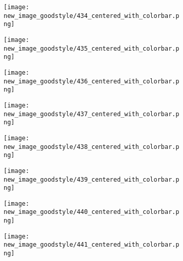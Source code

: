 \documentclass[a4paper,12pt]{article}
\begin{document}
\begin{figure}[H]
  \begin{subfigure}{0.11\textwidth}
    \texttt{[image: new\_image\_goodstyle/434\_centered\_with\_colorbar.png]}
  \end{subfigure}
  \hfill
  \begin{subfigure}{0.11\textwidth}
    \texttt{[image: new\_image\_goodstyle/435\_centered\_with\_colorbar.png]}
  \end{subfigure}
  \hfill
  \begin{subfigure}{0.11\textwidth}
    \texttt{[image: new\_image\_goodstyle/436\_centered\_with\_colorbar.png]}
  \end{subfigure}
  \hfill
  \begin{subfigure}{0.11\textwidth}
    \texttt{[image: new\_image\_goodstyle/437\_centered\_with\_colorbar.png]}
  \end{subfigure}
  \hfill
  \begin{subfigure}{0.11\textwidth}
    \texttt{[image: new\_image\_goodstyle/438\_centered\_with\_colorbar.png]}
  \end{subfigure}
  \hfill
  \begin{subfigure}{0.11\textwidth}
    \texttt{[image: new\_image\_goodstyle/439\_centered\_with\_colorbar.png]}
  \end{subfigure}
  \hfill
  \begin{subfigure}{0.11\textwidth}
    \texttt{[image: new\_image\_goodstyle/440\_centered\_with\_colorbar.png]}
  \end{subfigure}
  \hfill
  \begin{subfigure}{0.11\textwidth}
    \texttt{[image: new\_image\_goodstyle/441\_centered\_with\_colorbar.png]}
  \end{subfigure}
  \hfill
\end{figure}
\end{document}
